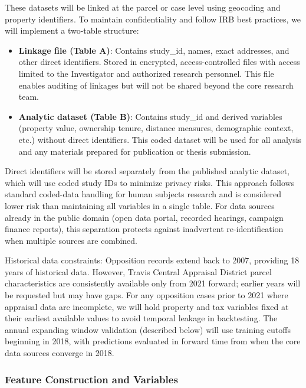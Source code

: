 \documentclass[12pt]{article}
\begin{document}
These datasets will be linked at the parcel or case level using geocoding and property identifiers. To maintain confidentiality and follow IRB best practices, we will implement a two-table structure:

\begin{itemize}
\item \textbf{Linkage file (Table A)}: Contains study\_id, names, exact addresses, and other direct identifiers. Stored in encrypted, access-controlled files with access limited to the Investigator and authorized research personnel. This file enables auditing of linkages but will not be shared beyond the core research team.
\item \textbf{Analytic dataset (Table B)}: Contains study\_id and derived variables (property value, ownership tenure, distance measures, demographic context, etc.) without direct identifiers. This coded dataset will be used for all analysis and any materials prepared for publication or thesis submission.
\end{itemize}

Direct identifiers will be stored separately from the published analytic dataset, which will use coded study IDs to minimize privacy risks. This approach follows standard coded-data handling for human subjects research and is considered lower risk than maintaining all variables in a single table. For data sources already in the public domain (open data portal, recorded hearings, campaign finance reports), this separation protects against inadvertent re-identification when multiple sources are combined.

Historical data constraints: Opposition records extend back to 2007, providing 18 years of historical data. However, Travis Central Appraisal District parcel characteristics are consistently available only from 2021 forward; earlier years will be requested but may have gaps. For any opposition cases prior to 2021 where appraisal data are incomplete, we will hold property and tax variables fixed at their earliest available values to avoid temporal leakage in backtesting. The annual expanding window validation (described below) will use training cutoffs beginning in 2018, with predictions evaluated in forward time from when the core data sources converge in 2018.

\subsubsection*{Feature Construction and Variables}
\end{document}
